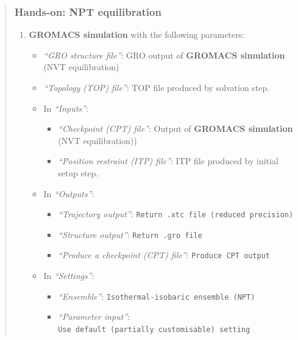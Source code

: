 \documentclass[twocolumn]{bmcart}%
\providecommand{\tightlist}{%
  \setlength{\itemsep}{0pt}\setlength{\parskip}{0pt}}
\providecommand{\tightlist}{%
  \setlength{\itemsep}{0pt}\setlength{\parskip}{0pt}}
\begin{document}
\begin{quote}
\subsubsection{Hands-on: NPT
equilibration}\label{hands-on-npt-equilibration}

\begin{enumerate}
\def\labelenumi{\arabic{enumi}.}
\tightlist
\item
  \textbf{GROMACS simulation} with the following parameters:

  \begin{itemize}
  \tightlist
  \item
    \emph{``GRO structure file''}: GRO output of \textbf{GROMACS
    simulation} (NVT equilibration)
  \item
    \emph{``Topology (TOP) file''}: TOP file produced by solvation step.
  \item
    In \emph{``Inputs''}:

    \begin{itemize}
    \tightlist
    \item
      \emph{``Checkpoint (CPT) file''}: Output of \textbf{GROMACS
      simulation} (NVT equilibration))
    \item
      \emph{``Position restraint (ITP) file''}: ITP file produced by
      initial setup step.
    \end{itemize}
  \item
    In \emph{``Outputs''}:

    \begin{itemize}
    \tightlist
    \item
      \emph{``Trajectory output''}:
      \texttt{Return\ .xtc\ file\ (reduced\ precision)}
    \item
      \emph{``Structure output''}: \texttt{Return\ .gro\ file}
    \item
      \emph{``Produce a checkpoint (CPT) file''}:
      \texttt{Produce\ CPT\ output}
    \end{itemize}
  \item
    In \emph{``Settings''}:

    \begin{itemize}
    \tightlist
    \item
      \emph{``Ensemble''}: \texttt{Isothermal-isobaric\ ensemble\ (NPT)}
    \item
      \emph{``Parameter input''}:
      \texttt{Use\ default\ (partially\ customisable)\ setting}


\end{itemize}
\end{itemize}
\end{enumerate}
\end{quote}
\end{document}

